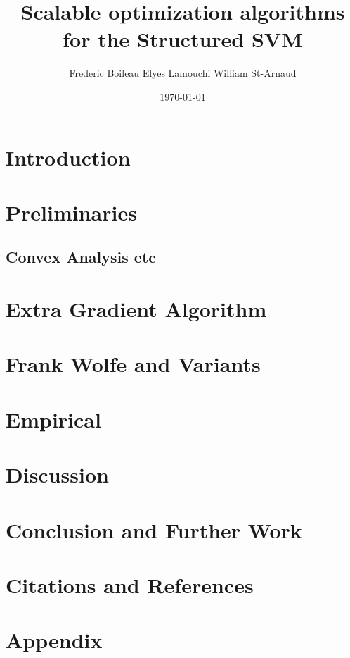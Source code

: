 

\usepackage[
  backend=biber,
  citestyle=authoryear-ibid,
  natbib=true
  ]{biblatex}
\usepackage{csquotes}
\renewcommand\nameyeardelim{, }



\title{Scalable optimization algorithms for the Structured SVM}
\date{\today}
\author{Frederic Boileau Elyes Lamouchi William St-Arnaud}

\maketitle

\clearpage
\section{Introduction}



\clearpage
\section{Preliminaries}

% 

\clearpage
\subsection{Convex Analysis etc}


\clearpage
\section{Extra Gradient Algorithm}


\clearpage
\section{Frank Wolfe and Variants}


\clearpage
\section{Empirical}


\clearpage
\section{Discussion}


\clearpage
\section{Conclusion and Further Work}


\clearpage
\section{Citations and References}
\printbibliography

\clearpage
\section{Appendix}


